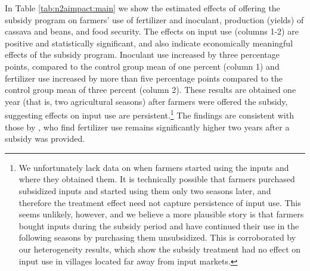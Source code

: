 In Table \ref{tab:n2aimpact:main} we show the estimated effects of offering the subsidy program on farmers’ use of fertilizer and inoculant, production (yields) of cassava and beans, and food security. The effects on input use (columns 1-2) are positive and statistically significant, and also indicate economically meaningful effects of the subsidy program. Inoculant use increased by three percentage points, compared to the control group mean of one percent (column 1) and fertilizer use increased by more than five percentage points compared to the control group mean of three percent (column 2). These results are obtained one year (that is, two agricultural seasons) after farmers were offered the subsidy, suggesting effects on input use are persistent.\footnote{We unfortunately lack data on when farmers started using the inputs and where they obtained them. It is technically possible that farmers purchased subsidized inputs and started using them only two seasons later, and therefore the treatment effect need not capture persistence of input use. This seems unlikely, however, and we believe a more plausible story is that farmers bought inputs during the subsidy period and have continued their use in the following seasons by purchasing them unsubsidized. This is corroborated by our heterogeneity results, which show the subsidy treatment had no effect on input use in villages located far away from input markets.} The findings are consistent with those by \cite{Carter2014}, who find fertilizer use remains significantly higher two years after a subsidy was provided. 



